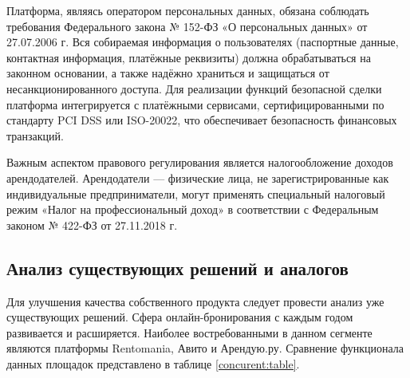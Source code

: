 Платформа, являясь оператором персональных данных, обязана соблюдать требования Федерального закона № 152-ФЗ «О персональных данных» от 27.07.2006 г. Вся собираемая информация о пользователях (паспортные данные, контактная информация, платёжные реквизиты) должна обрабатываться на законном основании, а также надёжно храниться и защищаться от несанкционированного доступа.\cite{zakon4} Для реализации функций безопасной сделки платформа интегрируется с платёжными сервисами, сертифицированными по стандарту PCI DSS или ISO-20022, что обеспечивает безопасность финансовых транзакций.

Важным аспектом правового регулирования является налогообложение доходов арендодателей. Арендодатели — физические лица, не зарегистрированные как индивидуальные предприниматели, могут применять специальный налоговый режим «Налог на профессиональный доход» в соответствии с Федеральным законом № 422-ФЗ от 27.11.2018 г.\cite{zakon3}

\subsection{Анализ существующих решений и аналогов}
Для улучшения качества собственного продукта следует провести анализ уже существующих решений. Сфера онлайн-бронирования с каждым годом развивается и расширяется. Наиболее востребованными в данном сегменте являются платформы Rentomania, Авито и Арендую.ру. Сравнение функционала данных площадок представлено в таблице \ref{concurent:table}.

